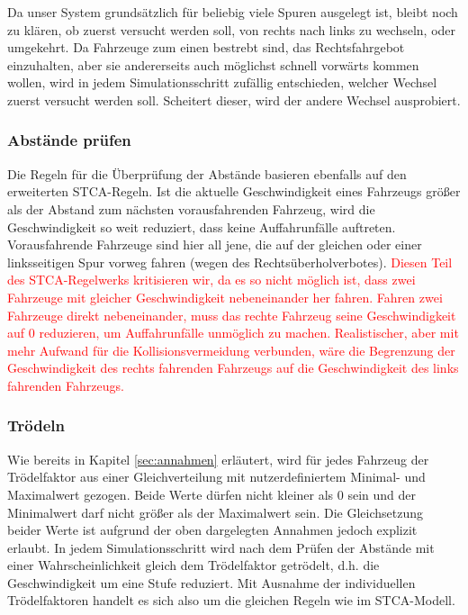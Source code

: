 \documentclass[10pt, a4paper]{article}
\begin{document}
Da unser System grundsätzlich für beliebig viele Spuren ausgelegt ist, bleibt noch zu klären, ob zuerst versucht werden soll, von rechts nach links zu wechseln, oder umgekehrt. Da Fahrzeuge zum einen bestrebt sind, das Rechtsfahrgebot einzuhalten, aber sie andererseits auch möglichst schnell vorwärts kommen wollen, wird in jedem Simulationsschritt zufällig entschieden, welcher Wechsel zuerst versucht werden soll. Scheitert dieser, wird der andere Wechsel ausprobiert.

\subsubsection{Abstände prüfen}
\label{subsubsec:abstaendePruefen}
Die Regeln für die Überprüfung der Abstände basieren ebenfalls auf den erweiterten STCA-Regeln. Ist die aktuelle Geschwindigkeit eines Fahrzeugs größer als der Abstand zum nächsten vorausfahrenden Fahrzeug, wird die Geschwindigkeit so weit reduziert, dass keine Auffahrunfälle auftreten. Vorausfahrende Fahrzeuge sind hier all jene, die auf der gleichen oder einer linksseitigen Spur vorweg fahren (wegen des Rechtsüberholverbotes). \textcolor{red}{Diesen Teil des STCA-Regelwerks kritisieren wir, da es so nicht möglich ist, dass zwei Fahrzeuge mit gleicher Geschwindigkeit nebeneinander her fahren. Fahren zwei Fahrzeuge direkt nebeneinander, muss das rechte Fahrzeug seine Geschwindigkeit auf 0 reduzieren, um Auffahrunfälle unmöglich zu machen. 
Realistischer, aber mit mehr Aufwand für die Kollisionsvermeidung verbunden, wäre die Begrenzung der Geschwindigkeit des rechts fahrenden Fahrzeugs auf die Geschwindigkeit des links fahrenden Fahrzeugs.}

\subsubsection{Trödeln}
\label{subsubsec:troedeln}

Wie bereits in Kapitel \ref{sec:annahmen} erläutert, wird für jedes Fahrzeug der Trödelfaktor aus einer Gleichverteilung mit nutzerdefiniertem Minimal- und Maximalwert gezogen. Beide Werte dürfen nicht kleiner als 0 sein und der Minimalwert darf nicht größer als der Maximalwert sein. Die Gleichsetzung beider Werte ist aufgrund der oben dargelegten Annahmen jedoch explizit erlaubt. In jedem Simulationsschritt wird nach dem Prüfen der Abstände mit einer Wahrscheinlichkeit gleich dem Trödelfaktor getrödelt, d.h. die Geschwindigkeit um eine Stufe reduziert. Mit Ausnahme der individuellen Trödelfaktoren handelt es sich also um die gleichen Regeln wie im STCA-Modell.
\end{document}
